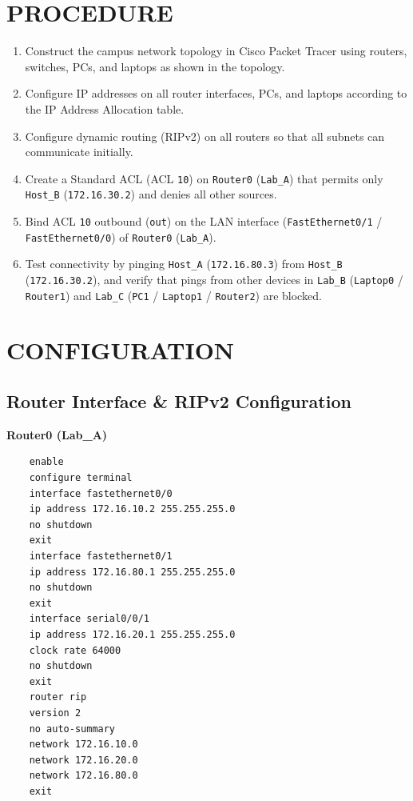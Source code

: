 \documentclass[12pt,a4paper]{article}
\begin{document}
\section*{PROCEDURE}
\begin{enumerate}
	\item Construct the campus network topology in Cisco Packet Tracer using routers, switches, PCs, and laptops as shown in the topology.
	\item Configure IP addresses on all router interfaces, PCs, and laptops according to the IP Address Allocation table.
	\item Configure dynamic routing (RIPv2) on all routers so that all subnets can communicate initially.
	\item Create a Standard ACL (ACL \texttt{10}) on \texttt{Router0} (\texttt{Lab\_A}) that permits only \texttt{Host\_B} (\texttt{172.16.30.2}) and denies all other sources.
	\item Bind ACL \texttt{10} outbound (\texttt{out}) on the LAN interface (\texttt{FastEthernet0/1} / \texttt{FastEthernet0/0}) of \texttt{Router0} (\texttt{Lab\_A}).
	\item Test connectivity by pinging \texttt{Host\_A} (\texttt{172.16.80.3}) from \texttt{Host\_B} (\texttt{172.16.30.2}), and verify that pings from other devices in \texttt{Lab\_B} (\texttt{Laptop0} / \texttt{Router1}) and \texttt{Lab\_C} (\texttt{PC1} / \texttt{Laptop1} / \texttt{Router2}) are blocked.
\end{enumerate}

\section*{CONFIGURATION}

\subsection*{Router Interface \& RIPv2 Configuration}
\textbf{Router0 (Lab\_A)}
\begin{lstlisting}
	enable
	configure terminal
	interface fastethernet0/0
	ip address 172.16.10.2 255.255.255.0
	no shutdown
	exit
	interface fastethernet0/1
	ip address 172.16.80.1 255.255.255.0
	no shutdown
	exit
	interface serial0/0/1
	ip address 172.16.20.1 255.255.255.0
	clock rate 64000
	no shutdown
	exit
	router rip
	version 2
	no auto-summary
	network 172.16.10.0
	network 172.16.20.0
	network 172.16.80.0
	exit
\end{lstlisting}
\end{document}
